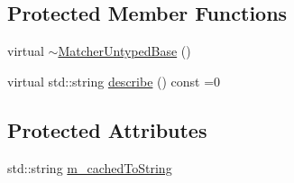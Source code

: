 \subsection*{Protected Member Functions}
\begin{DoxyCompactItemize}
\item 
virtual \hyperlink{class_catch_1_1_matchers_1_1_impl_1_1_matcher_untyped_base_a853be93ce33f71b5abede38081c79e9d}{$\sim$\-Matcher\-Untyped\-Base} ()
\item 
virtual std\-::string \hyperlink{class_catch_1_1_matchers_1_1_impl_1_1_matcher_untyped_base_a91d3a907dbfcbb596077df24f6e11fe2}{describe} () const =0
\end{DoxyCompactItemize}
\subsection*{Protected Attributes}
\begin{DoxyCompactItemize}
\item 
std\-::string \hyperlink{class_catch_1_1_matchers_1_1_impl_1_1_matcher_untyped_base_a951095c462657e7097a9a6dc4dde813f}{m\-\_\-cached\-To\-String}
\end{DoxyCompactItemize}


